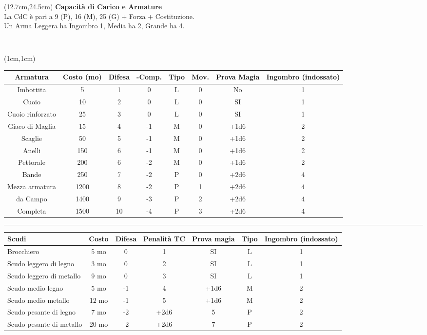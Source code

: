 \documentclass[a4paper,12 pt,openany]{book}
\newcommand{\riga}{\rule{\textwidth}{0.4pt}}
\begin{document}
\begin{textblock*}{7.8cm}(12.7cm,24.5cm) %
\textbf{Capacità di Carico e Armature}\\
La CdC è pari a 9 (P), 16 (M), 25 (G) + Forza + Costituzione.\\
Un Arma Leggera ha Ingombro 1, Media ha 2, Grande ha 4.
\end{textblock*}

~\newpage

\begin{textblock*}{18cm}(1cm,1cm) %

\begin{tabular}{cccccccc}
\textbf{Armatura} & \textbf{Costo (mo)} & \textbf{Difesa} & \textbf{-Comp.} &  \textbf{Tipo} & \textbf{Mov.} & \textbf{Prova Magia}&\textbf{Ingombro (indossato)}\\
\hline
Imbottita   & 5    & 1   & 0  &  L   & 0   & No&1\\
Cuoio   & 10   & 2   & 0   & L   & 0   & SI&1\\
Cuoio rinforzato   & 25  &3  & 0   &    L   & 0 &SI&1 \\
Giaco di Maglia   & 15   & 4  & -1  &  M   & 0  &+1d6&2\\
Scaglie& 50   & 5  & -1  &  M   & 0 &+1d6 &2\\
Anelli & 150  & 6  & -1  &  M   & 0  &+1d6&2\\
Pettorale    & 200  & 6  & -2  &  M  &  0 &+1d6 &2\\
Bande   & 250  & 7  & -2  &  P   & 0  &+2d6 &4\\
Mezza armatura   & 1200 & 8  & -2  &  P   & 1 &+2d6&4  \\
da Campo& 1400 & 9 & -3  &   P   & 2  &+2d6&4 \\
Completa& 1500 & 10  & -4  & P   & 3  &+2d6&4 \\
\end{tabular}

\riga

\begin{tabular}{lcccccc}
\textbf{Scudi} & \textbf{Costo} & \textbf{Difesa} & \textbf{Penalità TC} & \textbf{Prova magia} & \textbf{Tipo} & \textbf{Ingombro (indossato)}\\
\hline
Brocchiero& 5 mo  &  0& 1& SI& L&1\\
Scudo leggero di legno   & 3 mo  &  0& 2& SI  & L&1\\
Scudo leggero di metallo & 9  mo  &  0& 3&SI  & L&1\\
Scudo medio legno   & 5 mo   &  -1& 4& +1d6  & M&2\\
Scudo medio metallo & 12 mo  & -1  & 5& +1d6  & M&2\\
Scudo pesante di legno   & 7  mo  &  -2    & +2d6&5  & P&2\\
Scudo pesante di metallo & 20 mo  &  -2    & +2d6&7  & P&2\\
\end{tabular}


\end{textblock*}
\end{document}
